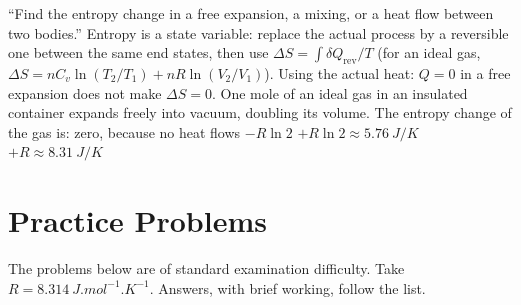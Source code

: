 {``Find the entropy change in a free expansion, a mixing, or a heat flow between two bodies.''}
{Entropy is a state variable: replace the actual process by a reversible one between the same end states,
then use $\Delta S=\int\delta Q_{\text{rev}}/T$ (for an ideal gas,
$\Delta S=nC_v\ln(T_2/T_1)+nR\ln(V_2/V_1)$).}
{Using the actual heat: $Q=0$ in a free expansion does not make $\Delta S=0$.}
{One mole of an ideal gas in an insulated container expands freely into vacuum, doubling its volume. The
entropy change of the gas is:}
{zero, because no heat flows}
{$-R\ln2$}
{$+R\ln2\approx\SI{+5.76}{J/K}$}
{$+R\approx\SI{+8.31}{J/K}$}

\section{Practice Problems}\label{sec:practice-thermo}

The problems below are of standard examination difficulty. Take $R=\SI{8.314}{J.mol^{-1}.K^{-1}}$.
Answers, with brief working, follow the list.

